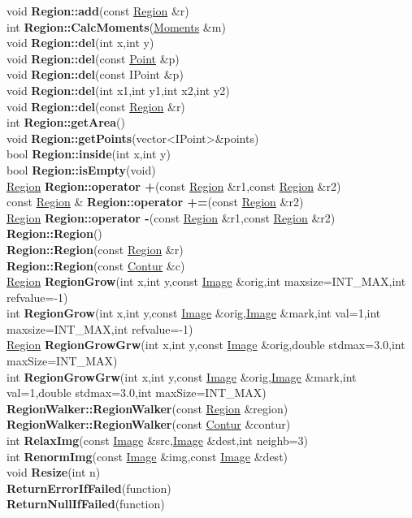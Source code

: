 \documentclass[10pt,titlepage]{article}
\def\functionlistentry#1#2#3#4#5#6{\noindent #1 {\bf #2}(#3) \dotfill #6\\}
\begin{document}
{{\functionlistentry{void}{Region::add}{const \hyperlink{Region}{Region} \&r}{482}{conturs}{}
\functionlistentry{int}{Region::CalcMoments}{\hyperlink{Moments}{Moments} \&m}{494}{conturs}{}
\functionlistentry{void}{Region::del}{int x,int y}{485}{conturs}{}
\functionlistentry{void}{Region::del}{const \hyperlink{Point}{Point} \&p}{486}{conturs}{}
\functionlistentry{void}{Region::del}{const IPoint \&p}{487}{conturs}{}
\functionlistentry{void}{Region::del}{int x1,int y1,int x2,int y2}{488}{conturs}{}
\functionlistentry{void}{Region::del}{const \hyperlink{Region}{Region} \&r}{489}{conturs}{}
\functionlistentry{int}{Region::getArea}{}{493}{conturs}{}
\functionlistentry{void}{Region::getPoints}{vector\textless {}IPoint\textgreater  \&points}{495}{conturs}{}
\functionlistentry{bool}{Region::inside}{int x,int y}{491}{conturs}{}
\functionlistentry{bool}{Region::isEmpty}{void}{492}{conturs}{}
\functionlistentry{\hyperlink{Region}{Region}}{Region::operator +}{const \hyperlink{Region}{Region} \&r1,const \hyperlink{Region}{Region} \&r2}{484}{conturs}{}
\functionlistentry{const \hyperlink{Region}{Region} \&}{Region::operator +=}{const \hyperlink{Region}{Region} \&r2}{483}{conturs}{}
\functionlistentry{\hyperlink{Region}{Region}}{Region::operator -}{const \hyperlink{Region}{Region} \&r1,const \hyperlink{Region}{Region} \&r2}{490}{conturs}{}
\functionlistentry{}{Region::Region}{}{474}{conturs}{}
\functionlistentry{}{Region::Region}{const \hyperlink{Region}{Region} \&r}{475}{conturs}{}
\functionlistentry{}{Region::Region}{const \hyperlink{Contur}{Contur} \&c}{476}{conturs}{}
\functionlistentry{\hyperlink{Region}{Region}}{RegionGrow}{int x,int y,const \hyperlink{Image}{Image} \&orig,int maxsize=INT\_MAX,int refvalue=-1}{1145}{segmentation}{}
\functionlistentry{int}{RegionGrow}{int x,int y,const \hyperlink{Image}{Image} \&orig,\hyperlink{Image}{Image} \&mark,int val=1,int maxsize=INT\_MAX,int refvalue=-1}{1146}{segmentation}{}
\functionlistentry{\hyperlink{Region}{Region}}{RegionGrowGrw}{int x,int y,const \hyperlink{Image}{Image} \&orig,double stdmax=3.0,int maxSize=INT\_MAX}{1147}{segmentation}{}
\functionlistentry{int}{RegionGrowGrw}{int x,int y,const \hyperlink{Image}{Image} \&orig,\hyperlink{Image}{Image} \&mark,int val=1,double stdmax=3.0,int maxSize=INT\_MAX}{1148}{segmentation}{}
\functionlistentry{}{RegionWalker::RegionWalker}{const \hyperlink{Region}{Region} \&region}{193}{datastructures}{}
\functionlistentry{}{RegionWalker::RegionWalker}{const \hyperlink{Contur}{Contur} \&contur}{194}{datastructures}{}
\functionlistentry{int}{RelaxImg}{const \hyperlink{Image}{Image} \&src,\hyperlink{Image}{Image} \&dest,int neighb=3}{388}{filter}{}
\functionlistentry{int}{RenormImg}{const \hyperlink{Image}{Image} \&img,const \hyperlink{Image}{Image} \&dest}{1094}{processing}{}
\functionlistentry{void}{Resize}{int n}{238}{datastructures}{}
\functionlistentry{}{ReturnErrorIfFailed}{function}{1552}{errorHandling}{}
\functionlistentry{}{ReturnNullIfFailed}{function}{1551}{errorHandling}{}

}}
\end{document}
